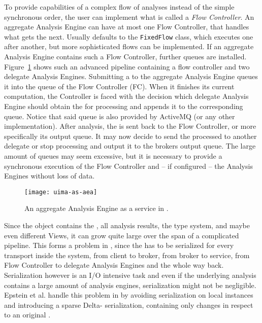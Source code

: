 To provide capabilities of a complex flow of analyses instead of the simple synchronous order, the user can implement what is called a \emph{Flow Controller}. An aggregate Analysis Engine can have at most one Flow Controller, that handles what \anen{} gets the \cas{} next. Usually \uima{} defaults to the \lstinline|FixedFlow| class, which executes \anens{} one after another, but more sophisticated flows can be implemented. If an aggregate Analysis Engine contains such a Flow Controller, further queues are installed. Figure~\ref{fig:uimaas-aea} shows such an advanced pipeline containing a flow controller and two delegate Analysis Engines. Submitting a \cas{} to the aggregate Analysis Engine queues it into the queue of the Flow Controller (FC). When it finishes its current computation, the Controller is faced with the decision which delegate Analysis Engine should obtain the \cas{} for processing and appends it to the corresponding queue. Notice that said queue is also provided by ActiveMQ (or any other implementation). After analysis, the \cas{} is sent back to the Flow Controller, or more specifically its output queue. It may now decide to send the processed \cas{} to another delegate \anen{} or stop processing and output it to the brokers output queue. The large amount of queues may seem excessive, but it is necessary to provide a synchronous execution of the Flow Controller and -- if configured -- the Analysis Engines without loss of data.

\begin{figure}[hbt]
	\centering
	\texttt{[image: uima-as-aea]}
	\caption[An aggregate Analysis Engine as a service in UIMA-AS.]{An aggregate Analysis Engine as a service in \uimaas{} \cite{uimaas:documentation}.}
	\label{fig:uimaas-aea}
\end{figure}

Since the \cas{} object contains the \sofa{}, all analysis results, the type system, and maybe even different Views, it can grow quite large over the span of a complicated pipeline. This forms a problem in \uimaas{}, since the \cas{} has to be serialized for every transport inside the system, from client to broker, from broker to service, from Flow Controller to delegate Analysis Engines and the whole way back. Serialization however is an I/O intensive task and even if the underlying \nlp{} analysis contains a large amount of analysis engines, serialization might not be negligible. Epstein et al. handle this problem in \cite{epstein2012making} by avoiding serialization on local instances and introducing a sparse Delta-\cas{} serialization, containing only changes in respect to an original \cas{}.

